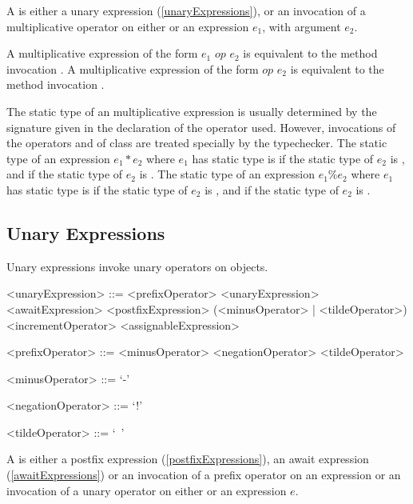 \documentclass[makeidx]{article}
\begin{document}
\LMHash{}%
 A  is either a unary expression (\ref{unaryExpressions}), or an invocation of a multiplicative operator on either \SUPER{} or an expression $e_1$, with argument $e_2$.

\LMHash{}%
A multiplicative expression of the form $e_1$ $op$ $e_2$ is equivalent to the method invocation .
A multiplicative expression of the form \SUPER{} $op$ $e_2$ is equivalent to the method invocation .

\LMHash{}%
The static type of an multiplicative expression is usually determined by the signature given in the declaration of the operator used.
However, invocations of the operators \code{*} and \code{\%} of class  are treated specially by the typechecker.
The static type of an expression $e_1 * e_2$ where $e_1$ has static type  is  if the static type of $e_2$ is , and  if the static type of $e_2$ is .
The static type of an expression $e_1 \% e_2$ where $e_1$ has static type  is  if the static type of $e_2$ is , and  if the static type of $e_2$ is .

\subsection{Unary Expressions}

\LMHash{}%
Unary expressions invoke unary operators on objects.

\begin{grammar}
<unaryExpression> ::= <prefixOperator> <unaryExpression>
  \alt <awaitExpression>
  \alt <postfixExpression>
  \alt (<minusOperator> | <tildeOperator>) \SUPER{}
  \alt <incrementOperator> <assignableExpression>

<prefixOperator> ::= <minusOperator>
  \alt <negationOperator>
  \alt <tildeOperator>

<minusOperator> ::= `-'

<negationOperator> ::= `!'

<tildeOperator> ::= `~'
\end{grammar}

\LMHash{}%
A  is either a postfix expression (\ref{postfixExpressions}), an await expression (\ref{awaitExpressions}) or an invocation of a prefix operator on an expression or an invocation of a unary operator on either \SUPER{} or an expression $e$.
\end{document}
